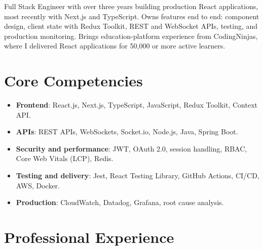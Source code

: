 \documentclass[11pt,a4paper,sans]{moderncv}
\begin{document}
\makecvtitle

\vspace{6pt}
{\small Full Stack Engineer with over three years building production React applications, most recently with Next.js and TypeScript. Owns features end to end: component design, client state with Redux Toolkit, REST and WebSocket APIs, testing, and production monitoring. Brings education-platform experience from CodingNinjas, where I delivered React applications for 50,000 or more active learners.\par}

\section{Core Competencies}
\vspace{1pt}
\begin{itemize}

\item \textbf{Frontend}: React.js, Next.js, TypeScript, JavaScript, Redux Toolkit, Context API.

\item \textbf{APIs}: REST APIs, WebSockets, Socket.io, Node.js, Java, Spring Boot.

\item \textbf{Security and performance}: JWT, OAuth 2.0, session handling, RBAC, Core Web Vitals (LCP), Redis.

\item \textbf{Testing and delivery}: Jest, React Testing Library, GitHub Actions, CI/CD, AWS, Docker.

\item \textbf{Production}: CloudWatch, Datadog, Grafana, root cause analysis.

\end{itemize}

\section{Professional Experience}
\vspace{3pt}
\end{document}
